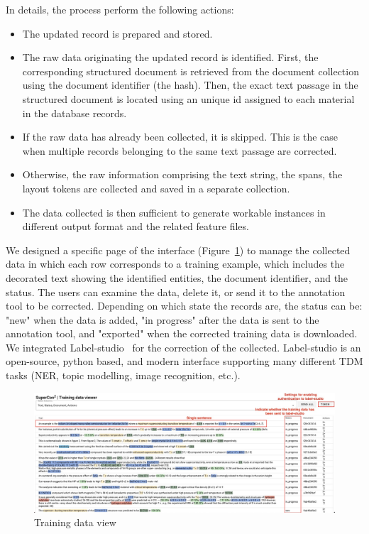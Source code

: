 \documentclass[a4paper]{article}
\begin{document}
In details, the process perform the following actions:
\begin{itemize}
    \item The updated record is prepared and stored.
    \item The raw data originating the updated record is identified. First, the corresponding structured document is retrieved from the document collection using the document identifier (the hash). Then, the exact text passage in the structured document is located using an unique id assigned to each material in the database records.
    \item If the raw data has already been collected, it is skipped. This is the case when multiple records belonging to the same text passage are corrected.
    \item Otherwise, the raw information comprising the text string, the spans, the layout tokens are collected and saved in a separate collection.
    \item The data collected is then sufficient to generate workable instances in different output format and the related feature files.
\end{itemize}

We designed a specific page of the interface (Figure~\ref{fig:training-data-view}) to manage the collected data in which each row corresponds to a training example, which includes the decorated text showing the identified entities, the document identifier, and the status. 
The users can examine the data, delete it, or send it to the annotation tool to be corrected. 
Depending on which state the records are, the status can be: "new" when the data is added, "in progress" after the data is sent to the annotation tool, and "exported" when the corrected training data is downloaded. 
We integrated Label-studio~\cite{Label_Studio} for the correction of the collected. Label-studio is an open-source, python based, and modern interface supporting many different TDM tasks (NER, topic modelling, image recognition, etc.). 

\begin{figure}[ht]
  \centering
  \includegraphics[width=1\textwidth]{images/training-data-viewer} 
  \caption{Training data view}
  \label{fig:training-data-view}
\end{figure}
\end{document}
